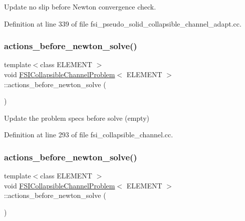 Update no slip before Newton convergence check. 



Definition at line 339 of file fsi\+\_\+pseudo\+\_\+solid\+\_\+collapsible\+\_\+channel\+\_\+adapt.\+cc.

\mbox{\label{classFSICollapsibleChannelProblem_ad10b2d12be052c6b1bc5005dc27cd229}} 
\subsubsection{\texorpdfstring{actions\+\_\+before\+\_\+newton\+\_\+solve()}{actions\_before\_newton\_solve()}\hspace{0.1cm}{\footnotesize\ttfamily [1/4]}}
{\footnotesize\ttfamily template$<$class E\+L\+E\+M\+E\+NT $>$ \\
void \hyperlink{classFSICollapsibleChannelProblem}{F\+S\+I\+Collapsible\+Channel\+Problem}$<$ E\+L\+E\+M\+E\+NT $>$\+::actions\+\_\+before\+\_\+newton\+\_\+solve (\begin{DoxyParamCaption}{ }\end{DoxyParamCaption})\hspace{0.3cm}{\ttfamily [inline]}}



Update the problem specs before solve (empty) 



Definition at line 293 of file fsi\+\_\+collapsible\+\_\+channel.\+cc.

\mbox{\label{classFSICollapsibleChannelProblem_ad10b2d12be052c6b1bc5005dc27cd229}} 
\subsubsection{\texorpdfstring{actions\+\_\+before\+\_\+newton\+\_\+solve()}{actions\_before\_newton\_solve()}\hspace{0.1cm}{\footnotesize\ttfamily [2/4]}}
{\footnotesize\ttfamily template$<$class E\+L\+E\+M\+E\+NT $>$ \\
void \hyperlink{classFSICollapsibleChannelProblem}{F\+S\+I\+Collapsible\+Channel\+Problem}$<$ E\+L\+E\+M\+E\+NT $>$\+::actions\+\_\+before\+\_\+newton\+\_\+solve (\begin{DoxyParamCaption}{ }\end{DoxyParamCaption})\hspace{0.3cm}{\ttfamily [inline]}}



